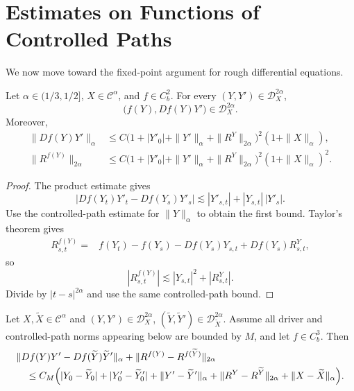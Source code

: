\section{Estimates on Functions of Controlled Paths}

We now move toward the fixed-point argument for rough differential equations.

\begin{lem}
Let $\alpha\in(1/3,1/2]$, $X\in\mathcal C^\alpha$, and $f\in C_b^2$.
For every $(Y,Y')\in\mathscr D_X^{2\alpha}$,
\[
  \bigl(f(Y),Df(Y)Y'\bigr)\in\mathscr D_X^{2\alpha}.
\]
Moreover,
\begin{align*}
 \|Df(Y)Y'\|_\alpha
 &\le C\bigl(1+|Y'_0|+\|Y'\|_\alpha+\|R^Y\|_{2\alpha}\bigr)^2
          (1+\|X\|_\alpha),\\
 \|R^{f(Y)}\|_{2\alpha}
 &\le C\bigl(1+|Y'_0|+\|Y'\|_\alpha+\|R^Y\|_{2\alpha}\bigr)^2
          (1+\|X\|_\alpha)^2.
\end{align*}
\end{lem}

\begin{proof}
The product estimate gives
\[
 |Df(Y_t)Y'_t-Df(Y_s)Y'_s|
 \lesssim |Y'_{s,t}|+|Y_{s,t}|\,|Y'_s|.
\]
Use the controlled-path estimate for $\|Y\|_\alpha$ to obtain the first bound.
Taylor's theorem gives
\begin{align*}
R^{f(Y)}_{s,t}
={}&f(Y_t)-f(Y_s)-Df(Y_s)Y_{s,t}+Df(Y_s)R^Y_{s,t},
\end{align*}
so
\[
 |R^{f(Y)}_{s,t}|
 \lesssim |Y_{s,t}|^2+|R^Y_{s,t}|.
\]
Divide by $|t-s|^{2\alpha}$ and use the same controlled-path bound.
\end{proof}

\begin{lem}
Let $X,\widetilde X\in\mathcal C^\alpha$ and
$(Y,Y')\in\mathscr D_X^{2\alpha}$,
$(\widetilde Y,\widetilde Y')\in\mathscr D_{\widetilde X}^{2\alpha}$.
Assume all driver and controlled-path norms appearing below are bounded by
$M$, and let $f\in C_b^3$.  Then
\begin{align*}
&\|Df(Y)Y'-Df(\widetilde Y)\widetilde Y'\|_\alpha
 +\|R^{f(Y)}-R^{f(\widetilde Y)}\|_{2\alpha}\\
&\quad\le C_M\Bigl(
 |Y_0-\widetilde Y_0|+|Y'_0-\widetilde Y'_0|
 +\|Y'-\widetilde Y'\|_\alpha
 +\|R^Y-R^{\widetilde Y}\|_{2\alpha}
 +\|X-\widetilde X\|_\alpha\Bigr).
\end{align*}
\end{lem}

